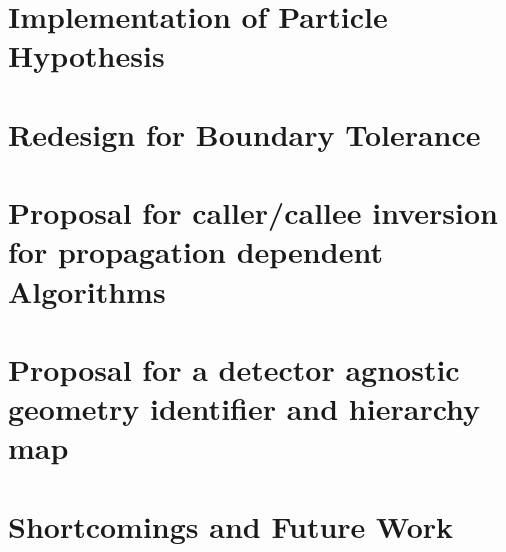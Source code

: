 \section{Implementation of Particle Hypothesis}

\section{Redesign for Boundary Tolerance}

\section{Proposal for caller/callee inversion for propagation dependent Algorithms}

\section{Proposal for a detector agnostic geometry identifier and hierarchy map}

\section{Shortcomings and Future Work}

